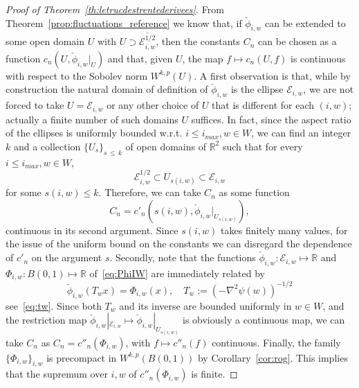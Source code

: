 \documentclass[AHL,Unicode,longabstracts,published]{cedram}
\newcommand{\R}{\mathbb{R}}
\newcommand{\clE}{\mathcal{E}}
\begin{document}
\begin{proof}[Proof of Theorem~\ref{th:letrucdestrentederivees}]
From Theorem~\ref{prop:fluctuations_reference} we know that, if $\check\phi_{i,w}$ can be extended to some open domain $U$ with $U\supset \overline{\clE^{1/2}_{i,w}}$, then the constants $C_n$ can be chosen as a function $c_n(U,\check \phi_{i,w}|_U)$ and that, given $U$, the map $f\mapsto c_n(U,f)$ is continuous with respect to the Sobolev norm $W^{k,p}(U)$. A first observation is that, while by construction the natural domain of definition of $\check \phi_{i,w}$ is the ellipse $\clE_{i,w}$, we are not forced to take $U= \clE_{i,w}$ or any other choice of $U$ that is different for each $(i,w)$; actually a finite number of such domains $U$ suffices. In fact, since the aspect ratio of the ellipses is uniformly bounded w.r.t. $i\le i_{max},w\in W$, we can find an integer $k$ and a collection $\{U_s\}_{s\,\le\,k}$ of open domains of $\R^2$ such that for every $i\le i_{max},w\in W$,
\begin{equation}
\clE^{1/2}_{i,w}\subset U_{s(i,w)} \subset \clE_{i,w}
\end{equation}
for some $s(i,w)\le k$. Therefore, we can take $C_n$ as some function
\begin{equation}
C_n=c'_n\left(s(i,w),\check\phi_{i,w}|_{U_{s(i,w)}}\right),
\end{equation}
continuous in its second argument. Since $s(i,w)$ takes finitely many values, for the issue of the uniform bound on the constants we can disregard the dependence of $c'_n$ on the argument $s$. Secondly, note that the functions $\check\phi_{i,w}:\clE_{i,w}\mapsto \R$ and $\Phi_{i,w}:B(0,1)\mapsto \R$ of~\eqref{eq:PhiIW} are immediately related by
\begin{equation}
\check \phi_{i,w}(T_w x) = \Phi_{i,w}(x), \quad T_w:=\left(-\nabla^2\psi(w)\right)^{-1/2}
\end{equation}
see~\eqref{eq:tw}. Since both $T_w$ and its inverse are bounded uniformly in $w\in W$, and the restriction map $\check\phi_{i,w}|_{\clE_{i,w}}\mapsto
\check\phi_{i,w}|_{U_{s(i,w)}}$ is obviously a continuous map, we can take $C_n$ as $C_n=c''_n(\Phi_{i,w})$, with $f\mapsto c''_n(f)$ continuous. Finally, the family $\{\Phi_{i,w}\}_{i,w}$ is precompact in $W^{k,p}(B(0,1))$ by Corollary~\ref{cor:rog}. This implies that the supremum over $i,w$ of $c''_n(\Phi_{i,w})$ is finite.
\end{proof}
\end{document}
